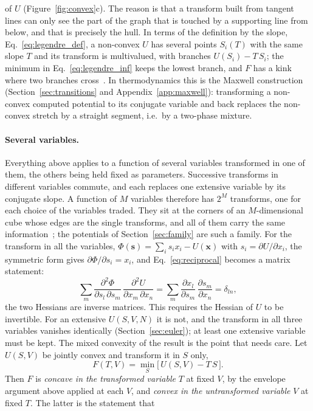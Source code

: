 \documentclass[10pt,a4paper]{article}
\theoremstyle{remark}
\begin{document}
of $U$ (Figure~\ref{fig:convex}c). The reason is that a transform built from
tangent lines can only see the part of the graph that is touched by a
supporting line from below, and that is precisely the hull. In terms of the
definition by the slope, Eq.~\eqref{eq:legendre_def}, a non-convex $U$ has
several points $S_i(T)$ with the same slope $T$ and its transform is
multivalued, with branches $U(S_i)-T\,S_i$; the minimum in
Eq.~\eqref{eq:legendre_inf} keeps the lowest branch, and $F$ has a kink where
two branches cross~\cite{Zia}. In thermodynamics
this is the Maxwell construction (Section~\ref{sec:transitions} and
Appendix~\ref{app:maxwell}): transforming a non-convex computed potential to its
conjugate variable and back replaces the non-convex stretch by a straight
segment, i.e.\ by a two-phase mixture.

\paragraph{Several variables.} Everything above applies to a function of
several variables transformed in one of them, the others being held fixed as
parameters. Successive transforms in different variables commute, and each
replaces one extensive variable by its conjugate slope. A function of $M$
variables therefore has $2^{M}$ transforms, one for each choice of the
variables traded. They sit at the corners of an $M$-dimensional cube whose
edges are the single transforms, and all of them carry the same
information~\cite{Zia}; the potentials of Section~\ref{sec:family} are such a
family. For the transform in all the variables,
$\Phi(\mathbf{s})=\sum_i s_i x_i-U(\mathbf{x})$ with $s_i=\partial U/\partial
x_i$, the symmetric form gives $\partial\Phi/\partial s_i=x_i$, and
Eq.~\eqref{eq:reciprocal} becomes a matrix statement:
\[
  \sum_{m}\frac{\partial^{2}\Phi}{\partial s_l\,\partial s_m}\,
  \frac{\partial^{2}U}{\partial x_m\,\partial x_n}
  =\sum_m\frac{\partial x_l}{\partial s_m}\,\frac{\partial s_m}{\partial x_n}
  =\delta_{ln} ,
\]
the two Hessians are inverse matrices. This requires the Hessian of $U$ to be
invertible. For an extensive $U(S,V,N)$ it is not, and the transform in all
three variables vanishes identically (Section~\ref{sec:euler}); at least one
extensive variable must be kept. The mixed convexity
of the result is the point that needs care. Let $U(S,V)$ be jointly convex and
transform it in $S$ only,
\[
  F(T,V)=\min_S\big[\,U(S,V)-T\,S\,\big] .
\]
Then $F$ is \emph{concave in the transformed variable} $T$ at fixed $V$, by
the envelope argument above applied at each $V$, and \emph{convex in the
untransformed variable} $V$ at fixed $T$. The latter is the statement that
\end{document}
